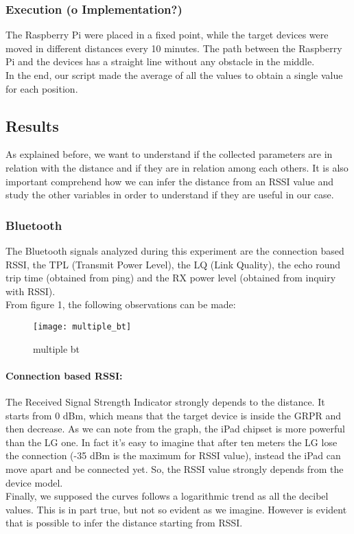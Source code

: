 \subsubsection{Execution (o Implementation?)}
The Raspberry Pi were placed in a fixed point, while the target devices were moved in different distances every 10 minutes. The path between the Raspberry Pi and the devices has a straight line without any obstacle in the middle.\\
In the end, our script made the average of all the values to obtain a single value for each position.
\subsection{Results}
As explained before, we want to understand if the collected parameters are in relation with the distance and if they are in relation among each others. It is also important comprehend how we can infer the distance from an RSSI value and study the other variables in order to understand if they are useful in our case.
\subsubsection{Bluetooth}
The Bluetooth signals analyzed during this experiment are the connection based RSSI, the TPL (Transmit Power Level), the LQ (Link Quality), the echo round trip time (obtained from ping) and the RX power level (obtained from inquiry with RSSI).\\
From figure 1, the following observations can be made:
\begin{figure}[htbp]
\centering
\texttt{[image: multiple\_bt]}
\caption{multiple bt}
\end{figure}
\paragraph{Connection based RSSI:} The Received Signal Strength Indicator strongly depends to the distance. It starts from 0 dBm, which means that the target device is inside the GRPR and then decrease. As we can note from the graph, the iPad chipset is more powerful than the LG one. In fact it's easy to imagine that after ten meters the LG lose the connection (-35 dBm is the maximum for RSSI value), instead the iPad can move apart and be connected yet. So, the RSSI value strongly depends from the device model.\\
Finally, we supposed the curves follows a logarithmic trend as all the decibel values. This is in part true, but not so evident as we imagine. However is evident that is possible to infer the distance starting from RSSI.
